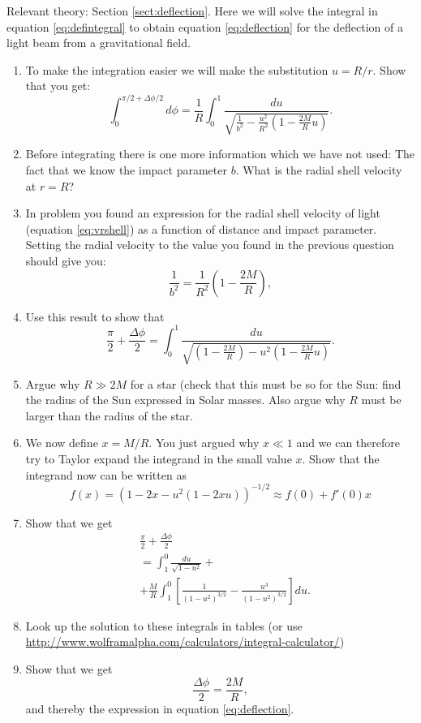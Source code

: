 {\begin{multicols}{2}
\vspace{0.5cm}



Relevant theory: Section \ref{sect:deflection}.\newline
Here we will solve the integral in equation \ref{eq:defintegral} to obtain equation \ref{eq:deflection} for the deflection of a light beam from a gravitational field.
\begin{enumerate}

\item To make the integration easier we will make the substitution $u=R/r$. Show that you get:
\[
\int_0^{\pi/2+\Delta\phi/2}d\phi=\frac{1}{R}\int_0^1\frac{du}{\sqrt{\frac{1}{b^2}-\frac{u^2}{R^2}\left(1-\frac{2M}{R}u\right)}}.
\]
\item Before integrating there is one more information which we have not used: The fact that we know the impact parameter $b$. What is the radial shell velocity at $r=R$? 
\item In problem  you found an expression for the radial shell velocity of light (equation \ref{eq:vrshell}) as a function of distance and impact parameter. Setting the radial velocity to the value you found in the previous question should give you:
\begin{equation}
\label{eq:vrshell2}
\frac{1}{b^2}=\frac{1}{R^2}\left(1-\frac{2M}{R}\right),
\end{equation}
\item Use this result to show that
\[
\frac{\pi}{2}+\frac{\Delta\phi}{2}=\int_0^1\frac{du}{\sqrt{\left(1-\frac{2M}{R}\right)-u^2\left(1-\frac{2M}{R}u\right)}}.
\]
\item Argue why $R\gg2M$ for a star (check that this must be so for the Sun: find the radius of the Sun expressed in Solar masses. Also argue why $R$ must be larger than the radius of the star.
\item We now define $x=M/R$. You just argued why $x\ll1$ and we can therefore try to Taylor expand the integrand in the small value $x$. Show that the integrand now can be written as
\[
f(x)=(1-2x-u^2(1-2xu))^{-1/2}\approx f(0)+f'(0)x
\]
\item Show that we get
\begin{align*}
&\frac{\pi}{2}+\frac{\Delta\phi}{2}\\
&=\int_1^0\frac{du}{\sqrt{1-u^2}}+\\
&+\frac{M}{R}\int_1^0\left[\frac{1}{(1-u^2)^{3/2}}-\frac{u^3}{(1-u^2)^{3/2}}\right]du.
\end{align*}
\item Look up the solution to these integrals in tables (or use \url{http://www.wolframalpha.com/calculators/integral-calculator/})
\item Show that we get
\[
\frac{\Delta\phi}{2}=\frac{2M}{R},
\]
and thereby the expression in equation \ref{eq:deflection}.
\end{enumerate}


\end{multicols}}

